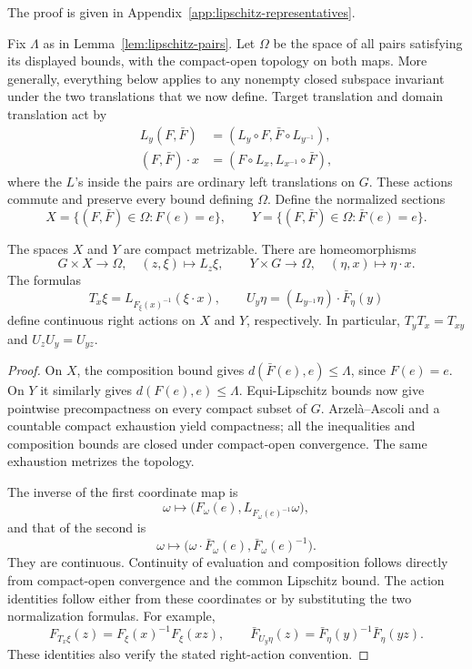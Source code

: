 The proof is given in Appendix~\ref{app:lipschitz-representatives}.

Fix $\Lambda$ as in Lemma~\ref{lem:lipschitz-pairs}.  Let $\Omega$ be
the space of all pairs satisfying its displayed bounds, with the
compact-open topology on both maps.  More generally, everything below
applies to any nonempty closed subspace invariant under the two
translations that we now define.  Target translation and domain
translation act by
\begin{align*}
 L_y(F,\bar F)&=(L_y\circ F,\bar F\circ L_{y^{-1}}),\\
 (F,\bar F)\cdot x&=(F\circ L_x,L_{x^{-1}}\circ\bar F),
\end{align*}
where the $L$'s inside the pairs are ordinary left translations on $G$.
These actions commute and preserve every bound defining $\Omega$.
Define the normalized sections
\[
 X=\{(F,\bar F)\in\Omega:F(e)=e\},\qquad
 Y=\{(F,\bar F)\in\Omega:\bar F(e)=e\}.
\]

\begin{lemma}\label{lem:pair-sections}
The spaces $X$ and $Y$ are compact metrizable.  There are
homeomorphisms
\[
 G\times X\longrightarrow\Omega,\quad (z,\xi)\longmapsto L_z\xi,
 \qquad
 Y\times G\longrightarrow\Omega,\quad (\eta,x)\longmapsto\eta\cdot x.
\]
The formulas
\[
 T_x\xi=L_{F_\xi(x)^{-1}}(\xi\cdot x),\qquad
 U_y\eta=(L_{y^{-1}}\eta)\cdot\bar F_\eta(y)
\]
define continuous right actions on $X$ and $Y$, respectively.
In particular, $T_yT_x=T_{xy}$ and $U_zU_y=U_{yz}$.
\end{lemma}

\begin{proof}
On $X$, the composition bound gives
$d(\bar F(e),e)\le\Lambda$, since $F(e)=e$.  On $Y$ it similarly
gives $d(F(e),e)\le\Lambda$.  Equi-Lipschitz bounds now give pointwise
precompactness on every compact subset of $G$.  Arzel\`a--Ascoli and a
countable compact exhaustion yield compactness; all the inequalities
and composition bounds are closed under compact-open convergence.
The same exhaustion metrizes the topology.

The inverse of the first coordinate map is
\[
 \omega\longmapsto
 \bigl(F_\omega(e),L_{F_\omega(e)^{-1}}\omega\bigr),
\]
and that of the second is
\[
 \omega\longmapsto
 \bigl(\omega\cdot\bar F_\omega(e),\bar F_\omega(e)^{-1}\bigr).
\]
They are continuous.  Continuity of evaluation and composition follows
directly from compact-open convergence and the common Lipschitz bound.
The action identities follow either from these coordinates or by
substituting the two normalization formulas.  For example,
\[
 F_{T_x\xi}(z)=F_\xi(x)^{-1}F_\xi(xz),\qquad
 \bar F_{U_y\eta}(z)=\bar F_\eta(y)^{-1}\bar F_\eta(yz).
\]
These identities also verify the stated right-action convention.
\end{proof}

